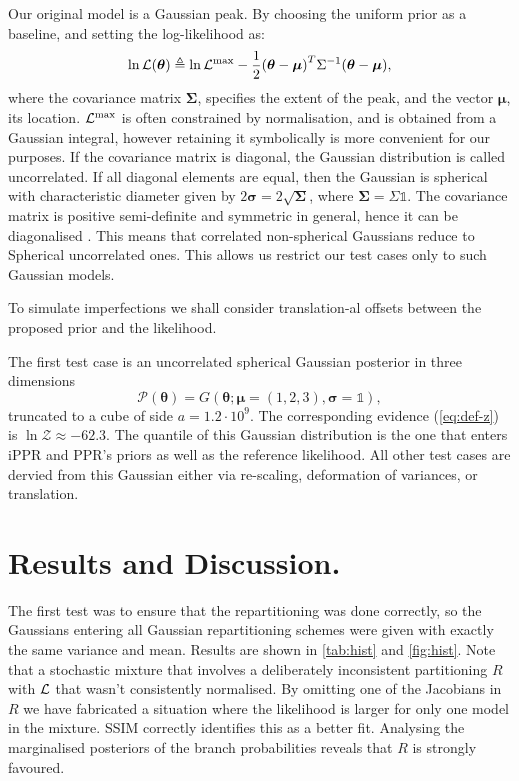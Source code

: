 \documentclass[usenatbib]{mnras}
\begin{document}
Our original model is a Gaussian peak. By choosing the uniform prior
as a baseline, and setting the log-likelihood as:
\begin{equation}
  \ln {\cal L}(\bm{\theta}) \triangleq \ln {\cal L}^\text{max}- \dfrac{1}{2}{(\bm{\theta} - \bm{\mu})}^{T}\Sigma^{-1}(\bm{\theta}-\bm{\mu}),
\end{equation}
where the covariance matrix \(\bm{\Sigma}\), specifies the extent of
the peak, and the vector \(\bm{\mu}\), its location.
\({\cal L}^\text{max}\) is often constrained by normalisation, and is
obtained from a Gaussian integral, however retaining it symbolically
is more convenient for our purposes.  If the covariance matrix is
diagonal, the Gaussian distribution is called uncorrelated. If all
diagonal elements are equal, then the Gaussian is spherical with
characteristic diameter given by
\(2\bm{\sigma} = 2\sqrt{\bm{\Sigma}}\), where
\(\bm{\Sigma} = \Sigma \mathds{1}\).  The covariance matrix is
positive semi-definite and symmetric in general, hence it can be
diagonalised \citep{taboga2017lectures}. This means that correlated
non-spherical Gaussians reduce to Spherical uncorrelated ones. This
allows us restrict our test cases only to such Gaussian models.

To simulate imperfections we shall consider translation-al offsets
between the proposed prior and the likelihood.


The first test case is an uncorrelated spherical Gaussian posterior
in three dimensions
\begin{equation}
\mathcal{P}(\bm{\theta}) = G(\bm{\theta}; \bm{\mu} =
  (1,2,3),\bm{\sigma} = \mathds{1}),
\end{equation}
truncated to a cube of side \(a = 1.2 \cdot 10^{9}\). The
corresponding evidence (\cref{eq:def-z}) is
\(\ln \mathcal{Z}\approx-62.3\). The quantile of this Gaussian
distribution is the one that enters iPPR and PPR's priors as well as
the reference likelihood. All other test cases are dervied from this
Gaussian either via re-scaling, deformation of variances, or
translation. 


\section{Results and Discussion.}\label{sec:results}
The first test was to ensure that the repartitioning was done
correctly, so the Gaussians entering all Gaussian repartitioning
schemes were given with exactly the same variance and mean. Results
are shown in \cref{tab:hist} and \cref{fig:hist}. Note that a
stochastic mixture that involves a deliberately inconsistent
partitioning \(R\) with ${\cal L}$ that wasn't consistently
normalised. By omitting one of the Jacobians in \(R\) we have
fabricated a situation where the likelihood is larger for only one
model in the mixture. SSIM correctly identifies this as a better
fit. Analysing the marginalised posteriors of the branch probabilities
reveals that \(R\) is strongly favoured. 
\end{document}
